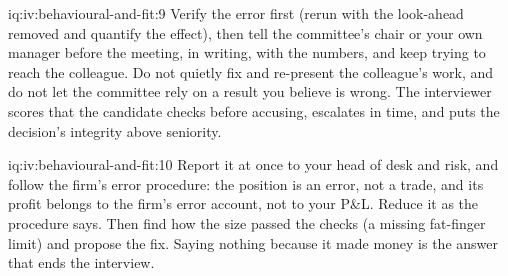 \begin{solution}{iq:iv:behavioural-and-fit:9}
Verify the error first (rerun with the look-ahead removed and quantify the effect), then tell the committee's chair or your own
manager before the meeting, in writing, with the numbers, and keep trying to reach the colleague. Do not quietly fix and re-present
the colleague's work, and do not let the committee rely on a result you believe is wrong. The interviewer scores that the
candidate checks before accusing, escalates in time, and puts the decision's integrity above seniority.
\end{solution}

\begin{solution}{iq:iv:behavioural-and-fit:10}
Report it at once to your head of desk and risk, and follow the firm's error procedure: the position is an error, not a trade, and its
profit belongs to the firm's error account, not to your P\&L. Reduce it as the procedure says. Then find how the size passed the
checks (a missing fat-finger limit) and propose the fix. Saying nothing because it made money is the answer that ends the interview.
\end{solution}
